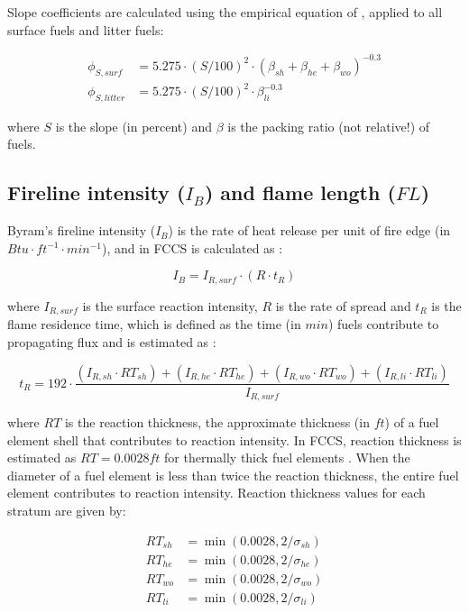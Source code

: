 \documentclass[]{book}
\begin{document}
Slope coefficients are calculated using the empirical equation of
\citet{Rothermel1972}, applied to all surface fuels and litter fuels:

\begin{eqnarray}
\phi_{S, surf} &= 5.275 \cdot (S/100)^{2}\cdot (\beta_{sh}+\beta_{he}+\beta_{wo})^{-0.3}\\
\phi_{S, litter} &= 5.275 \cdot (S/100)^{2}\cdot \beta_{li}^{-0.3}
\end{eqnarray}

where \(S\) is the slope (in percent) and \(\beta\) is the packing ratio
(not relative!) of fuels.

\subsection{\texorpdfstring{Fireline intensity (\(I_B\)) and flame
length
(\(FL\))}{Fireline intensity (I\_B) and flame length (FL)}}\label{fireline-intensity-i_b-and-flame-length-fl}

Byram's fireline intensity (\(I_B\)) is the rate of heat release per
unit of fire edge (in \(Btu\cdot ft^{-1} \cdot min^{-1}\)), and in FCCS
is calculated as \citep{Albini1976}:

\begin{equation}
I_B = I_{R,surf} \cdot (R \cdot t_R)
\end{equation}

where \(I_{R,surf}\) is the surface reaction intensity, \(R\) is the
rate of spread and \(t_R\) is the flame residence time, which is defined
as the time (in \(min\)) fuels contribute to propagating flux and is
estimated as \citet{Albini1976}:

\begin{equation}
t_R = 192 \cdot \frac{(I_{R,sh}\cdot RT_{sh})+(I_{R,he}\cdot RT_{he})+(I_{R,wo}\cdot RT_{wo})+(I_{R,li}\cdot RT_{li})}{I_{R,surf}}
\end{equation}

where \(RT\) is the reaction thickness, the approximate thickness (in
\(ft\)) of a fuel element shell that contributes to reaction intensity.
In FCCS, reaction thickness is estimated as \(RT = 0.0028 ft\) for
thermally thick fuel elements \citep{Sandberg2007}. When the diameter of
a fuel element is less than twice the reaction thickness, the entire
fuel element contributes to reaction intensity. Reaction thickness
values for each stratum are given by:

\begin{eqnarray}
RT_{sh} &= \min(0.0028, 2/\sigma_{sh})\\
RT_{he} &= \min(0.0028, 2/\sigma_{he})\\
RT_{wo} &= \min(0.0028, 2/\sigma_{wo})\\
RT_{li} &= \min(0.0028, 2/\sigma_{li})
\end{eqnarray}
\end{document}
